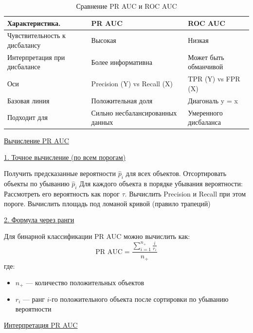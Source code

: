 \begin{table}[h]
    \centering
    \begin{tabular}{|p{}|p{}|p{}|} \hline
        \textbf{Характеристика.}       & \textbf{PR AUC}                  & \textbf{ROC AUC}      \\ \hline
        Чувствительность к дисбалансу & Высокая                          & Низкая                \\ \hline
        Интерпретация при дисбалансе  & Более информативна               & Может быть обманчивой \\ \hline
        Оси                           & Precision (Y) vs Recall (X)      & TPR (Y) vs FPR (X)    \\ \hline
        Базовая линия                 & Положительная доля               & Диагональ y = x       \\ \hline
        Подходит для                  & Сильно несбалансированных данных & Умеренного дисбаланса \\ \hline
    \end{tabular}
    \caption{Сравнение PR AUC и ROC AUC}
    \label{tab:pr roc comp}
\end{table}

\underline{Вычисление PR AUC}

\underline{1. Точное вычисление (по всем порогам)}

\begin{algorithmic}[1]
    \State Получить предсказанные вероятности $\hat{p}_i$ для всех объектов.
    \State Отсортировать объекты по убыванию $\hat{p}_i$
    \State Для каждого объекта в порядке убывания вероятности:
    \State \quad Рассмотреть его вероятность как порог $\tau$.
    \State \quad Вычислить Precision и Recall при этом пороге.
    \State Вычислить площадь под ломаной кривой (правило трапеций)
\end{algorithmic}

\underline{2. Формула через ранги}

Для бинарной классификации PR AUC можно вычислить как:
\[ \text{PR AUC} = \frac{\sum_{i=1}^{n_+} \frac{i}{r_i}}{n_+} \]
где:
\begin{itemize}
    \item $n_+$ --- количество положительных объектов
    \item $r_i$ --- ранг $i$-го положительного объекта после сортировки по убыванию вероятности
\end{itemize}

\underline{Интерпретация PR AUC}

